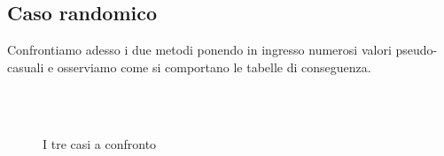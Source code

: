 \subsection{Caso randomico}

Confrontiamo adesso i due metodi ponendo in ingresso numerosi valori pseudo-casuali e osserviamo come si comportano le tabelle di conseguenza.

\begin{figure}[p]
\centering
{} \\
   \\     
\caption{I tre casi a confronto}
\label{fig:random_casi}
\end{figure}


